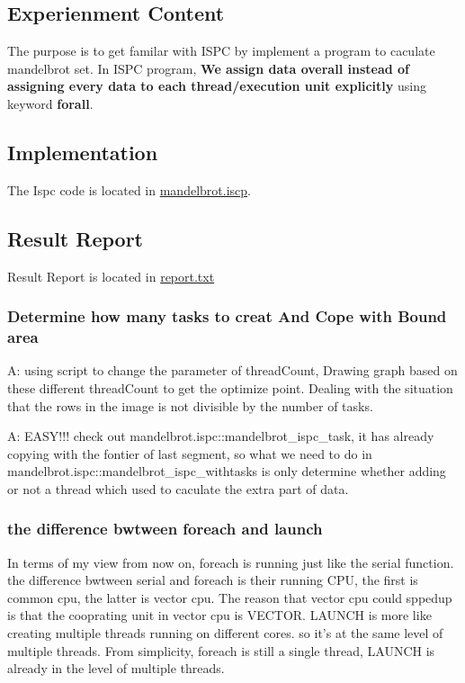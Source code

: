 \documentclass[a4paper]{article}
\begin{document}
\subsection{Experienment Content}
The purpose is to get familar with ISPC by implement a program to caculate mandelbrot set. In ISPC program, \textbf{We assign data overall instead of assigning every data to each thread/execution unit explicitly} using keyword \textbf{forall}.

\subsection{Implementation}
The Ispc code is located in \href{https://github.com/GiganticRay/CMU-418618HW/blob/main/asst1-f18/prog3_mandelbrot_ispc/mandelbrot.ispc}{mandelbrot.iscp}.

\subsection{Result Report}
Result Report is located in \href{https://github.com/GiganticRay/CMU-418618HW/blob/main/asst1-f18/prog3_mandelbrot_ispc/report.txt}{report.txt}

\subsubsection{Determine how many tasks to creat And Cope with Bound area}
A: using script to change the parameter of threadCount, Drawing graph based on these different threadCount to get the optimize point.
    Dealing with the situation that the rows in the image is not divisible by the number of tasks.
    
A: EASY!!! check out mandelbrot.ispc::mandelbrot\_ispc\_task, it has already copying with the fontier of last segment, so what we need to do in mandelbrot.ispc::mandelbrot\_ispc\_withtasks is only determine whether adding or not a thread which used to caculate the extra part of data.

\subsubsection{the difference bwtween foreach and launch}
In terms of my view from now on, foreach is running just like the serial function. the difference bwtween serial and foreach is their running CPU, the first is common cpu, the latter is vector cpu. The reason that vector cpu could sppedup is that the cooprating unit in vector cpu is VECTOR. LAUNCH is more like creating multiple threads running on different cores. so it's at the same level of multiple threads. From simplicity, foreach is still a single thread, LAUNCH is already in the level of multiple threads.


% 
% 
\end{document}

